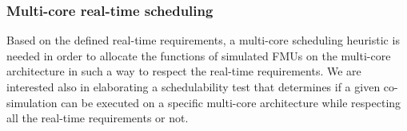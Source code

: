 \subsubsection{Multi-core real-time scheduling}

Based on the defined real-time requirements, a multi-core scheduling heuristic is needed in order to allocate the functions of simulated FMUs on the multi-core architecture in such a way to respect the real-time requirements. We are interested also in elaborating a schedulability test that determines if a given co-simulation can be executed on a specific multi-core architecture while respecting all the real-time requirements or not.  